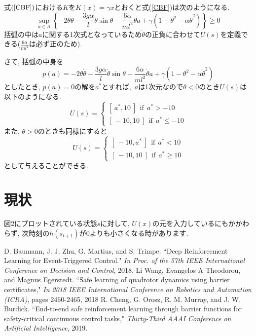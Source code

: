 \documentclass{jsarticle}
\begin{document}
式$(\ref{CBF})$における$K$を$K(x) = \gamma x$とおくと式(\ref{CBF})は次のようになる.
\begin{equation}
	\sup_{a\in A}\left\{-2\theta\dot{\theta}-\frac{3g\alpha}{l}\dot{\theta}\sin{\theta}-\frac{6\alpha}{ml^2}\dot{\theta} a+\gamma(1-\theta^2-\alpha\dot{\theta}^2)\right\} \geq 0 \label{special_cbf}
\end{equation}
括弧の中は$a$に関する1次式となっているため$\dot{\theta}$の正負に合わせて$U(s)$を定義できる($\frac{6\alpha}{ml^2}$は必ず正のため).\par
さて, 括弧の中身を
\begin{equation}
	p(a) = -2\theta\dot{\theta}-\frac{3g\alpha}{l}\dot{\theta}\sin{\theta}-\frac{6\alpha}{ml^2}\dot{\theta} a+\gamma(1-\theta^2-\alpha\dot{\theta}^2)
\end{equation}
としたとき, $p(a)=0$の解を$a^{*}$とすれば,~$a$は1次元なので$\theta<0$のとき$U(s)$は以下のようになる.
\begin{equation}
	U(s) = 
		\begin{cases}
			[~a^{*}, 10~]~~\textrm{if}~~ a^{*} > -10 \\
			[~-10, 10~]~~\textrm{if}~~ a^{*} \leq -10
		\end{cases}
\end{equation}
また, $\theta>0$のときも同様にすると
\begin{equation}
	U(s) = 
		\begin{cases}
			[~-10, a^{*}~]~~\textrm{if}~~ a^{*} < 10 \\
			[~-10, 10~]~~\textrm{if}~~ a^{*} \geq 10
		\end{cases}
\end{equation}
として与えることができる.

\section{現状}
図2にプロットされている状態$s$に対して, $U(x)$の元を入力しているにもかかわらず, 次時刻の$h(s_{t+1})$が0よりも小さくなる時があります.


\color{black}
\begin{thebibliography}{10}
D. Baumann, J. J. Zhu, G. Martius, and S. Trimpe. “Deep Reinforcement Learning for Event-Triggered Control."  \textit{In Proc. of the 57th IEEE International Conference on Decision and Control}, 2018.
Li Wang, Evangelos A Theodorou, and Magnus Egerstedt. “Safe learning of quadrotor dynamics using barrier certificates," \textit{In 2018 IEEE International Conference on Robotics and Automation (ICRA)}, pages 2460-2465, 2018
R. Cheng, G. Orosz, R. M. Murray, and J. W. Burdick.  “End-to-end safe reinforcement learning through barrier functions for safety-critical continuous control tasks," \textit{Thirty-Third AAAI Conference on Artificial Intelligence}, 2019.

\end{thebibliography}

 
\end{document}
